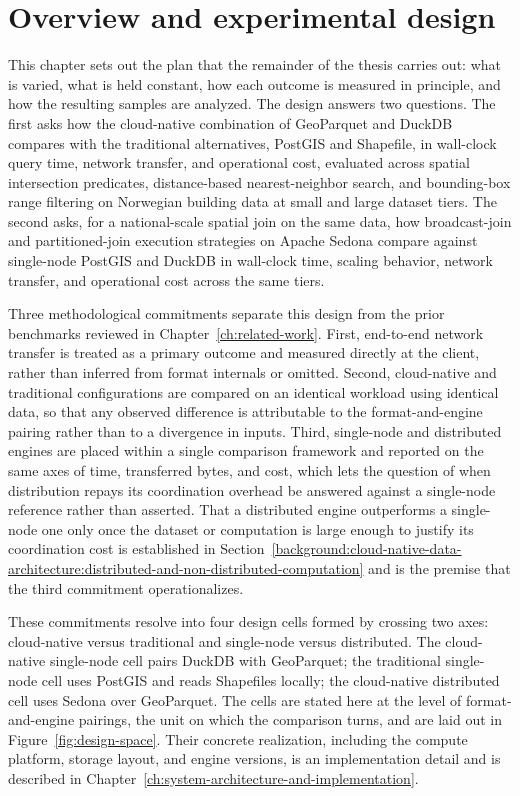 \section{Overview and experimental design}
\label{research-design-and-methodology:overview-and-experimental-design}

This chapter sets out the plan that the remainder of the thesis carries out: what is varied, what is held constant, how each outcome is measured in principle, and how the resulting samples are analyzed. The design answers two questions. The first asks how the cloud-native combination of GeoParquet and DuckDB compares with the traditional alternatives, PostGIS and Shapefile, in wall-clock query time, network transfer, and operational cost, evaluated across spatial intersection predicates, distance-based nearest-neighbor search, and bounding-box range filtering on Norwegian building data at small and large dataset tiers. The second asks, for a national-scale spatial join on the same data, how broadcast-join and partitioned-join execution strategies on Apache Sedona compare against single-node PostGIS and DuckDB in wall-clock time, scaling behavior, network transfer, and operational cost across the same tiers.

Three methodological commitments separate this design from the prior benchmarks reviewed in Chapter~\ref{ch:related-work}. First, end-to-end network transfer is treated as a primary outcome and measured directly at the client, rather than inferred from format internals or omitted. Second, cloud-native and traditional configurations are compared on an identical workload using identical data, so that any observed difference is attributable to the format-and-engine pairing rather than to a divergence in inputs. Third, single-node and distributed engines are placed within a single comparison framework and reported on the same axes of time, transferred bytes, and cost, which lets the question of when distribution repays its coordination overhead be answered against a single-node reference rather than asserted. That a distributed engine outperforms a single-node one only once the dataset or computation is large enough to justify its coordination cost is established in Section~\ref{background:cloud-native-data-architecture:distributed-and-non-distributed-computation} and is the premise that the third commitment operationalizes.

These commitments resolve into four design cells formed by crossing two axes: cloud-native versus traditional and single-node versus distributed. The cloud-native single-node cell pairs DuckDB with GeoParquet; the traditional single-node cell uses PostGIS and reads Shapefiles locally; the cloud-native distributed cell uses Sedona over GeoParquet. The cells are stated here at the level of format-and-engine pairings, the unit on which the comparison turns, and are laid out in Figure~\ref{fig:design-space}. Their concrete realization, including the compute platform, storage layout, and engine versions, is an implementation detail and is described in Chapter~\ref{ch:system-architecture-and-implementation}.

